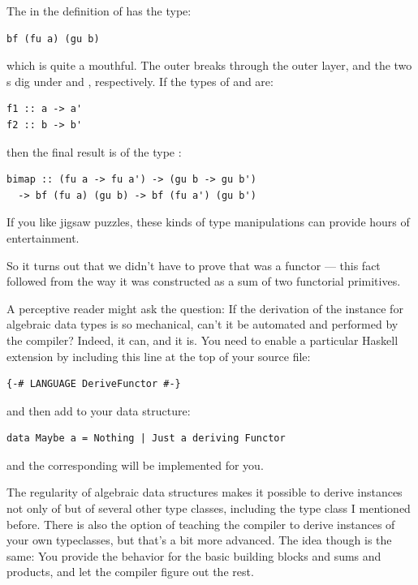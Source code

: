 The  in the definition of  has the type:

\begin{Verbatim}
bf (fu a) (gu b)
\end{Verbatim}
which is quite a mouthful. The outer  breaks through the
outer  layer, and the two s dig under
 and , respectively. If the types of 
and  are:

\begin{Verbatim}
f1 :: a -> a'
f2 :: b -> b'
\end{Verbatim}
then the final result is of the type
:

\begin{Verbatim}
bimap :: (fu a -> fu a') -> (gu b -> gu b')
  -> bf (fu a) (gu b) -> bf (fu a') (gu b')
\end{Verbatim}
If you like jigsaw puzzles, these kinds of type manipulations can
provide hours of entertainment.

So it turns out that we didn't have to prove that  was a
functor --- this fact followed from the way it was constructed as a sum
of two functorial primitives.

A perceptive reader might ask the question: If the derivation of the
 instance for algebraic data types is so mechanical,
can't it be automated and performed by the compiler? Indeed, it can, and
it is. You need to enable a particular Haskell extension by including
this line at the top of your source file:

\begin{Verbatim}
{-# LANGUAGE DeriveFunctor #-}
\end{Verbatim}
and then add  to your data structure:

\begin{Verbatim}
data Maybe a = Nothing | Just a deriving Functor
\end{Verbatim}
and the corresponding  will be implemented for you.

The regularity of algebraic data structures makes it possible to derive
instances not only of  but of several other type
classes, including the  type class I mentioned before. There
is also the option of teaching the compiler to derive instances of your
own typeclasses, but that's a bit more advanced. The idea though is the
same: You provide the behavior for the basic building blocks and sums
and products, and let the compiler figure out the rest.


